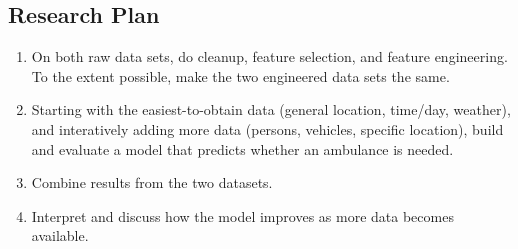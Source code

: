 \subsection{Research Plan}

\begin{enumerate}
	\item On both raw data sets, do cleanup, feature selection, and feature engineering.  To the extent possible, make the two engineered data sets the same.
	\item Starting with the easiest-to-obtain data (general location, time/day, weather), and interatively adding more data (persons, vehicles, specific location), build and evaluate a model that predicts whether an ambulance is needed.
	\item Combine results from the two datasets.
	\item Interpret and discuss how the model improves as more data becomes available.  
\end{enumerate}